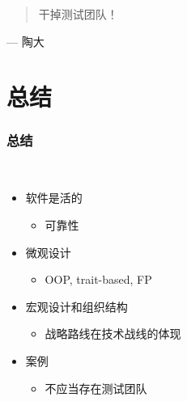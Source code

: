 \documentclass[UTF8,lualatex]{ctexbeamer}
\newcommand{\pagequote}[2]{
  \Large
  \begin{quotation}
      #1
  \end{quotation}
  \flushright\normalsize --- {#2}
}
\begin{document}

\begin{frame}
    \pagequote{
        干掉测试团队！}
        {陶大}
\end{frame}

\section{总结}

\begin{frame}
    \frametitle{总结}
    \begin{block}{~}
        \begin{itemize}
            \item 软件是活的
                \begin{itemize}
                    \item 可靠性
                \end{itemize}
            \item 微观设计
                \begin{itemize}
                    \item OOP, trait-based, FP
                \end{itemize}
            \item 宏观设计和组织结构
                \begin{itemize}
                    \item 战略路线在技术战线的体现
                \end{itemize}
            \item 案例
                \begin{itemize}
                    \item 不应当存在测试团队
                \end{itemize}
        \end{itemize}
    \end{block}
\end{frame}
\end{document}
